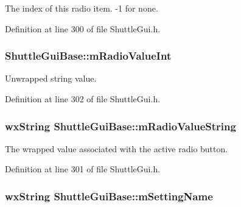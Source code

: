 The index of this radio item. -\/1 for none. 



Definition at line 300 of file Shuttle\+Gui.\+h.

\subsubsection[{\texorpdfstring{m\+Radio\+Value\+Int}{mRadioValueInt}}]{ Shuttle\+Gui\+Base\+::m\+Radio\+Value\+Int\hspace{0.3cm}{\ttfamily [protected]}}\hypertarget{class_shuttle_gui_base_a3a564bf16e8c72854211bf3dffd483fc}{}\label{class_shuttle_gui_base_a3a564bf16e8c72854211bf3dffd483fc}


Unwrapped string value. 



Definition at line 302 of file Shuttle\+Gui.\+h.

\subsubsection[{\texorpdfstring{m\+Radio\+Value\+String}{mRadioValueString}}]{\setlength{\rightskip}{0pt plus 5cm}wx\+String Shuttle\+Gui\+Base\+::m\+Radio\+Value\+String\hspace{0.3cm}{\ttfamily [protected]}}\hypertarget{class_shuttle_gui_base_a3aab5135c6827aff3c8bdbade82690d9}{}\label{class_shuttle_gui_base_a3aab5135c6827aff3c8bdbade82690d9}


The wrapped value associated with the active radio button. 



Definition at line 301 of file Shuttle\+Gui.\+h.

\subsubsection[{\texorpdfstring{m\+Setting\+Name}{mSettingName}}]{\setlength{\rightskip}{0pt plus 5cm}wx\+String Shuttle\+Gui\+Base\+::m\+Setting\+Name\hspace{0.3cm}{\ttfamily [protected]}}\hypertarget{class_shuttle_gui_base_a2bb4fe6c146c25c06d410235579a3659}{}\label{class_shuttle_gui_base_a2bb4fe6c146c25c06d410235579a3659}


